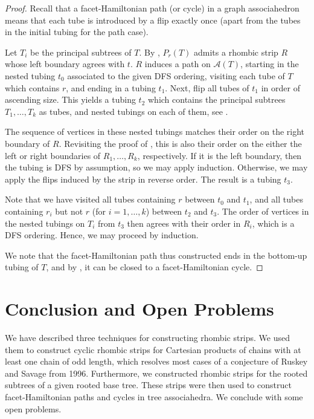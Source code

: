 \documentclass[fontsize=11pt,a4paper,DIV=12]{scrartcl}
\begin{document}
\treeassociahedrafh*
\begin{proof}
    Recall that a facet-Hamiltonian path (or cycle) in a graph associahedron means that each tube is introduced by a flip exactly once (apart from the tubes in the initial tubing for the path case).

    Let $T_i$ be the principal subtrees of $T$. By , $P_r(T)$ admits a rhombic strip $R$ whose left boundary agrees with $t$. $R$ induces a path on $\mathcal{A}(T)$, starting in the nested tubing $t_0$ associated to the given DFS ordering, visiting each tube of $T$ which contains $r$, and ending in a tubing $t_1$. Next, flip all tubes of $t_1$ in order of ascending size. This yields a tubing $t_2$ which contains the principal subtrees $T_1,\ldots,T_k$ as tubes, and nested tubings on each of them, see . 
    
    The sequence of vertices in these nested tubings matches their order on the right boundary of $R$. Revisiting the proof of , this is also their order on the either the left or right boundaries of $R_1,\ldots,R_k$, respectively. If it is the left boundary, then the tubing is DFS by assumption, so we may apply induction. Otherwise, we may apply the flips induced by the strip in reverse order. The result is a tubing $t_3$. 
    
    Note that we have visited all tubes containing $r$ between $t_0$ and $t_1$, and all tubes containing $r_i$ but not $r$ (for $i=1,\ldots,k$) between $t_2$ and $t_3$. The order of vertices in the nested tubings on $T_i$ from $t_3$ then agrees with their order in $R_i$, which is a DFS ordering. Hence, we may proceed by induction.

    We note that the facet-Hamiltonian path thus constructed ends in the bottom-up tubing of $T$, and by , it can be closed to a facet-Hamiltonian cycle.
\end{proof}

\section{Conclusion and Open Problems}\label{sec:conclusion}
We have described three techniques for constructing rhombic strips. We used
them to construct cyclic rhombic strips for Cartesian products of chains
with at least one chain of odd length, which resolves most cases of a
conjecture of Ruskey and Savage from 1996. Furthermore, we constructed rhombic
strips for the rooted subtrees of a given rooted base tree. These strips were
then used to construct facet-Hamiltonian paths and cycles in tree
associahedra. We conclude with some open problems.
\end{document}

